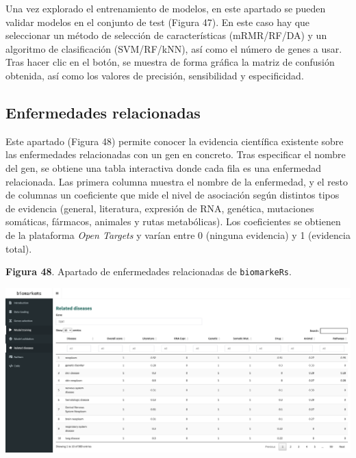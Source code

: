 Una vez explorado el entrenamiento de modelos, en este apartado se pueden validar modelos en el conjunto de test (Figura 47). En este caso hay que seleccionar un método de selección de características (mRMR/RF/DA) y un algoritmo de clasificación (SVM/RF/kNN), así como el número de genes a usar. Tras hacer clic en el botón, se muestra de forma gráfica la matriz de confusión obtenida, así como los valores de precisión, sensibilidad y especificidad.

\newpage
\subsection{Enfermedades relacionadas}

Este apartado (Figura 48) permite conocer la evidencia científica existente sobre las enfermedades relacionadas con un gen en concreto. Tras especificar el nombre del gen, se obtiene una tabla interactiva donde cada fila es una enfermedad relacionada. Las primera columna muestra el nombre de la enfermedad, y el resto de columnas un coeficiente que mide el nivel de asociación según distintos tipos de evidencia (general, literatura, expresión de RNA, genética, mutaciones somáticas, fármacos, animales y rutas metabólicas). Los coeficientes se obtienen de la plataforma \textit{Open Targets} \cite{OpenTargets2020} y varían entre 0 (ninguna evidencia) y 1 (evidencia total).

\begin{center}
	\textbf{Figura 48}. Apartado de enfermedades relacionadas de \texttt{biomarkeRs}.
\end{center}

\begin{center}
	\includegraphics[width=.90\textwidth]{figuras/48_related_diseases.png} \\
\end{center}

